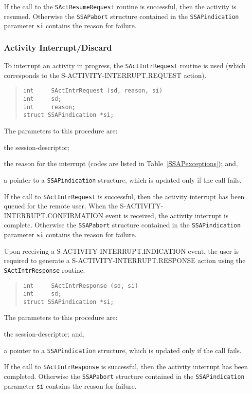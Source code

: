 If the call to the \verb"SActResumeRequest" routine is successful,
then the activity is resumed.
Otherwise the \verb"SSAPabort" structure contained in
the \verb"SSAPindication" parameter
\verb"si" contains the reason for failure.

\subsubsection	{Activity Interrupt/Discard}
To interrupt an activity in progress,
the \verb"SActIntrRequest" routine is used
(which corresponds to the {\sf S-ACTIVITY-INTERRUPT.REQUEST\/} action).
\begin{quote}\small\begin{verbatim}
int     SActIntrRequest (sd, reason, si)
int     sd;
int     reason;
struct SSAPindication *si;
\end{verbatim}\end{quote}
The parameters to this procedure are:
\begin{describe}
\item[\verb"sd":] the session-descriptor;

\item[\verb"reason":] the reason for the interrupt
(codes are listed in Table~\ref{SSAPexceptions});
and,

\item[\verb"si":] a pointer to a \verb"SSAPindication" structure, which is
updated only if the call fails.
\end{describe}
If the call to \verb"SActIntrRequest" is successful,
then the activity interrupt has been queued for the remote user.
When the {\sf S-ACTIVITY-INTERRUPT.CON\-FIR\-MA\-TION\/} event is received,
the activity interrupt is complete.
Otherwise the \verb"SSAPabort" structure contained in
the \verb"SSAPindication" parameter
\verb"si" contains the reason for failure.

Upon receiving a {\sf S-ACTIVITY-INTERRUPT.INDICATION\/} event,
the user is required to generate a {\sf S-ACTIVITY-INTERRUPT.RESPONSE\/} action
using the \verb"SActIntrResponse" routine.
\begin{quote}\small\begin{verbatim}
int     SActIntrResponse (sd, si)
int     sd;
struct SSAPindication *si;
\end{verbatim}\end{quote}
The parameters to this procedure are:
\begin{describe}
\item[\verb"sd":] the session-descriptor;
and,

\item[\verb"si":] a pointer to a \verb"SSAPindication" structure, which is
updated only if the call fails.
\end{describe}
If the call to \verb"SActIntrResponse" is successful,
then the activity interrupt has been completed.
Otherwise the \verb"SSAPabort" structure contained in
the \verb"SSAPindication" parameter
\verb"si" contains the reason for failure.

